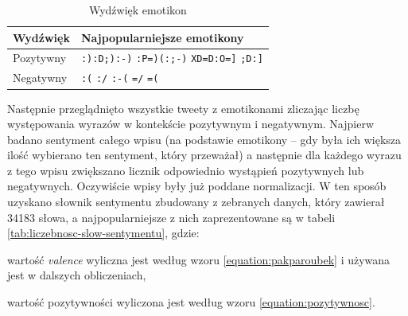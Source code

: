 \begin{table}[ht!]  
\begin{center}  
\begin{tabular}{|l|l|}
\hline
Wydźwięk & Najpopularniejsze emotikony
\\ \hline

Pozytywny & 

\texttt{:)}\quad \texttt{:D}\quad \texttt{;)}\quad \texttt{:-)}\quad 
\texttt{:P}\quad \texttt{=)}\quad \texttt{(:}\quad \texttt{;-)}\quad 
\texttt{XD}\quad \texttt{=D}\quad \texttt{:O}\quad \texttt{=]}\quad 
\texttt{;D}\quad \texttt{:]}\quad 

\\ \hline

Negatywny & 
\texttt{:(} \quad \texttt{:/} \quad \texttt{:-(} \quad \texttt{=/} \quad \texttt{=(}

\\ \hline

\end{tabular} 
\end{center} 
\caption{Wydźwięk emotikon}
\label{tab:wydzwiek-emotikon}
\end{table}

Następnie przeglądnięto wszystkie tweety z emotikonami zliczając liczbę
występowania wyrazów w kontekście pozytywnym i negatywnym.
Najpierw badano sentyment całego wpisu (na podstawie emotikony -- gdy była ich
większa ilość wybierano ten sentyment, który przeważał) a następnie dla każdego
wyrazu z tego wpisu zwiększano licznik odpowiednio wystąpień pozytywnych lub
negatywnych. Oczywiście wpisy były już poddane normalizacji.
W ten sposób uzyskano słownik sentymentu zbudowany z zebranych danych, który
zawierał 34183 słowa, a najpopularniejsze z nich zaprezentowane są w tabeli
\ref{tab:liczebnosc-slow-sentymentu}, gdzie:

wartość \textit{valence} wyliczna jest według wzoru \ref{equation:pakparoubek} 
i używana jest w dalszych obliczeniach,

wartość pozytywności wyliczona jest według wzoru \ref{equation:pozytywnosc}.

